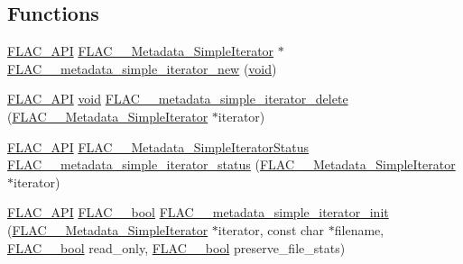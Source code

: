 \subsection*{Functions}
\begin{DoxyCompactItemize}
\item 
\mbox{\hyperlink{group__flac__export_ga56ca07df8a23310707732b1c0007d6f5}{F\+L\+A\+C\+\_\+\+A\+PI}} \mbox{\hyperlink{group__flac__metadata__level1_ga6accccddbb867dfc2eece9ee3ffecb3a}{F\+L\+A\+C\+\_\+\+\_\+\+Metadata\+\_\+\+Simple\+Iterator}} $\ast$ \mbox{\hyperlink{group__flac__metadata__level1_ga5b32f4eba211e05727428e9080f4e393}{F\+L\+A\+C\+\_\+\+\_\+metadata\+\_\+simple\+\_\+iterator\+\_\+new}} (\mbox{\hyperlink{_s_d_l__opengles2__gl2ext_8h_ae5d8fa23ad07c48bb609509eae494c95}{void}})
\item 
\mbox{\hyperlink{group__flac__export_ga56ca07df8a23310707732b1c0007d6f5}{F\+L\+A\+C\+\_\+\+A\+PI}} \mbox{\hyperlink{_s_d_l__opengles2__gl2ext_8h_ae5d8fa23ad07c48bb609509eae494c95}{void}} \mbox{\hyperlink{group__flac__metadata__level1_ga46e64734300a022bb9616b26228b0348}{F\+L\+A\+C\+\_\+\+\_\+metadata\+\_\+simple\+\_\+iterator\+\_\+delete}} (\mbox{\hyperlink{group__flac__metadata__level1_ga6accccddbb867dfc2eece9ee3ffecb3a}{F\+L\+A\+C\+\_\+\+\_\+\+Metadata\+\_\+\+Simple\+Iterator}} $\ast$iterator)
\item 
\mbox{\hyperlink{group__flac__export_ga56ca07df8a23310707732b1c0007d6f5}{F\+L\+A\+C\+\_\+\+A\+PI}} \mbox{\hyperlink{group__flac__metadata__level1_gac926e7d2773a05066115cac9048bbec9}{F\+L\+A\+C\+\_\+\+\_\+\+Metadata\+\_\+\+Simple\+Iterator\+Status}} \mbox{\hyperlink{group__flac__metadata__level1_ga68cfafa2323154f3ee1d3061eafe109f}{F\+L\+A\+C\+\_\+\+\_\+metadata\+\_\+simple\+\_\+iterator\+\_\+status}} (\mbox{\hyperlink{group__flac__metadata__level1_ga6accccddbb867dfc2eece9ee3ffecb3a}{F\+L\+A\+C\+\_\+\+\_\+\+Metadata\+\_\+\+Simple\+Iterator}} $\ast$iterator)
\item 
\mbox{\hyperlink{group__flac__export_ga56ca07df8a23310707732b1c0007d6f5}{F\+L\+A\+C\+\_\+\+A\+PI}} \mbox{\hyperlink{ordinals_8h_a95103469f1cbd78b8cf250194985b34e}{F\+L\+A\+C\+\_\+\+\_\+bool}} \mbox{\hyperlink{group__flac__metadata__level1_ga2a055cca4e6e06ae62517c8b0fa6e8a3}{F\+L\+A\+C\+\_\+\+\_\+metadata\+\_\+simple\+\_\+iterator\+\_\+init}} (\mbox{\hyperlink{group__flac__metadata__level1_ga6accccddbb867dfc2eece9ee3ffecb3a}{F\+L\+A\+C\+\_\+\+\_\+\+Metadata\+\_\+\+Simple\+Iterator}} $\ast$iterator, const char $\ast$filename, \mbox{\hyperlink{ordinals_8h_a95103469f1cbd78b8cf250194985b34e}{F\+L\+A\+C\+\_\+\+\_\+bool}} read\+\_\+only, \mbox{\hyperlink{ordinals_8h_a95103469f1cbd78b8cf250194985b34e}{F\+L\+A\+C\+\_\+\+\_\+bool}} preserve\+\_\+file\+\_\+stats)

\end{DoxyCompactItemize}
